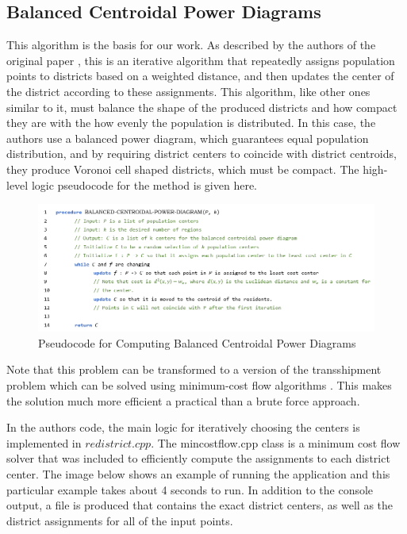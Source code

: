 \documentclass[11pt]{article}
\begin{document}
\subsection{Balanced Centroidal Power Diagrams}
This algorithm is the basis for our work. As described by the authors of the original paper \cite{cohenaddad2017balanced}, this is an iterative algorithm that repeatedly assigns population points  to districts based on a weighted distance, and then updates the center of the district according to these assignments. This algorithm, like other ones similar to it, must balance the shape of the produced districts and how compact they are with the how evenly the population is distributed. In this case, the authors use a balanced power diagram, which guarantees equal population distribution, and by requiring district centers to coincide with district centroids, they produce Voronoi cell shaped districts, which must be compact. The high-level logic pseudocode for the method is given here.

\begin{figure}[H]
	\centering
	\includegraphics[width=\textwidth]{pseudocode}
	\caption{Pseudocode for Computing Balanced Centroidal Power Diagrams}
	\label{fig:BCPD}
\end{figure}

Note that this problem can be transformed to a version of the transshipment problem which can be solved using minimum-cost flow algorithms \cite{TransshipmentWiki}. This makes the solution much more efficient a practical than a brute force approach.

\medskip

In the authors code, the main logic for iteratively choosing the centers is implemented in $redistrict.cpp$. The mincostflow.cpp class is a minimum cost flow solver that was included to efficiently compute the assignments to each district center. The image below shows an example of running the application and this particular example takes about 4 seconds to run. In addition to the console output, a file is produced that contains the exact district centers, as well as the district assignments for all of the input points. 
\end{document}
